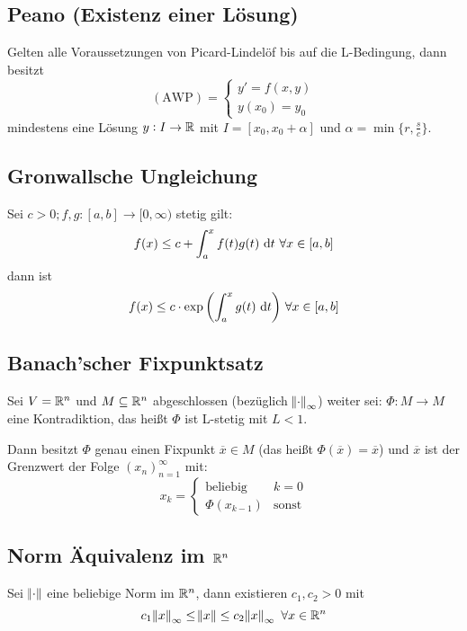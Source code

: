 \subsection{Peano (Existenz einer Lösung)}
Gelten alle Voraussetzungen von Picard-Lindelöf bis auf die L-Bedingung, dann besitzt
\begin{equation*}
	(\text{AWP}) = \begin{cases}
		y' = f(x,y) \\ y(x_0) = y_0
	\end{cases}
\end{equation*}
mindestens eine Lösung $y: I \rightarrow \mathbb{R}$ mit $I = [x_0, x_0 + \alpha]$ und $\alpha = \min \{ r, \frac{s}{c} \}$.

\subsection{Gronwallsche Ungleichung}
Sei $c > 0; f,g: [a,b] \rightarrow [0, \infty)$ stetig gilt:
\begin{equation*}
	f(x) \leq c + \int_a^x f(t) g(t) \text{ d}t\ \forall x \in [a,b]
\end{equation*}
dann ist
\begin{equation*}
	f(x) \leq c \cdot \exp{\left(\int_a^x g(t) \text{ d}t\right)}\ \forall x \in [a,b]
\end{equation*}

\subsection{Banach'scher Fixpunktsatz}
Sei $V = \mathbb{R}^n$ und $M \subseteq \mathbb{R}^n$ abgeschlossen (bezüglich $\norm{\cdot}_\infty$) weiter sei:
$\Phi: M \to M$ eine Kontradiktion, das heißt $\Phi$ ist L-stetig mit $L < 1$.

Dann besitzt $\Phi$ genau einen Fixpunkt $\overline{x} \in M$ (das heißt $\Phi(\overline{x}) = \overline{x}$) und
$\overline{x}$ ist der Grenzwert der Folge ${(x_n)}_{n=1}^\infty$ mit:
\begin{equation*}
	x_k = \begin{cases}
		\text{beliebig} & k = 0 \\
		\Phi({x_{k-1}}) & \text{sonst}
	\end{cases}
\end{equation*}

\subsection{Norm Äquivalenz im $\mathbb{R}^n$}
Sei $\norm{\cdot}$ eine beliebige Norm im $\mathbb{R}^n$, dann existieren $c_1, c_2 > 0$ mit
\begin{equation*}
 	c_1 \norm{x}_\infty \leq \norm{x} \leq c_2 \norm{x}_\infty\ \forall x \in \mathbb{R}^n
\end{equation*}

